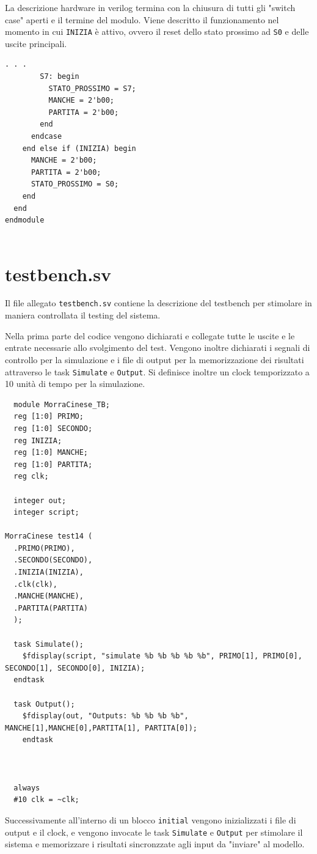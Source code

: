 \documentclass[a4paper]{report}
\begin{document}
La descrizione hardware in verilog termina con la chiusura di tutti gli "switch case" aperti e il termine del modulo.
Viene descritto il funzionamento nel momento in cui \texttt{INIZIA} è attivo, ovvero il reset dello stato prossimo ad \texttt{S0} e delle uscite principali. 
\begin{lstlisting}[firstnumber=348]
        . . .
        S7: begin
          STATO_PROSSIMO = S7;
          MANCHE = 2'b00;
          PARTITA = 2'b00;
        end
      endcase
    end else if (INIZIA) begin
      MANCHE = 2'b00;
      PARTITA = 2'b00;
      STATO_PROSSIMO = S0;
    end
  end
endmodule


\end{lstlisting}

\section{testbench.sv}

Il file allegato \texttt{testbench.sv} contiene la descrizione del testbench per stimolare in maniera controllata il testing del sistema.

Nella prima parte del codice vengono dichiarati e collegate tutte le uscite e le entrate necessarie allo svolgimento del test. 
Vengono inoltre dichiarati i segnali di controllo per la simulazione e i file di output per la memorizzazione dei risultati attraverso le task \texttt{Simulate} e \texttt{Output}.
Si definisce inoltre un clock temporizzato a 10 unità di tempo per la simulazione.
\begin{lstlisting}
  module MorraCinese_TB;
  reg [1:0] PRIMO;
  reg [1:0] SECONDO;
  reg INIZIA;
  reg [1:0] MANCHE;
  reg [1:0] PARTITA;
  reg clk;

  integer out;
  integer script;

MorraCinese test14 (
  .PRIMO(PRIMO),
  .SECONDO(SECONDO),
  .INIZIA(INIZIA),
  .clk(clk),
  .MANCHE(MANCHE),
  .PARTITA(PARTITA)
  );

  task Simulate();
    $fdisplay(script, "simulate %b %b %b %b %b", PRIMO[1], PRIMO[0], SECONDO[1], SECONDO[0], INIZIA);
  endtask

  task Output();   
    $fdisplay(out, "Outputs: %b %b %b %b", MANCHE[1],MANCHE[0],PARTITA[1], PARTITA[0]);
    endtask



  always
  #10 clk = ~clk;
\end{lstlisting}

Successivamente all'interno di un blocco \texttt{initial} vengono inizializzati i file di output e il clock, e vengono invocate le task \texttt{Simulate} e \texttt{Output} per stimolare il sistema e memorizzare i risultati sincronzzate agli input da "inviare" al modello.
\end{document}
